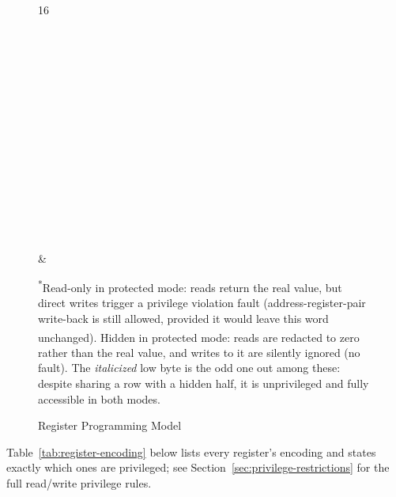 \begin{figure}[H]
	\centering
	\begin{bytefield}[bitwidth=1.1em]{16}
		 \\
		 \\
		 \\
		 \\
		 \\
		 \\
		 \\
		 \\
		 \\
		 \\
		 \\
		 \\
		 \\
		 \\
		 \\
		 \\
		 & 
	\end{bytefield}
	\caption{Register Programming Model}
	\label{fig:register-programming-model}

	\vspace{0.2cm}
	\footnotesize
	\textsuperscript{*}Read-only in protected mode: reads return the real value, but direct writes trigger a
	privilege violation fault (address-register-pair write-back is still allowed, provided it would leave this word
	unchanged). \quad \textsuperscript{\dag}Hidden in protected mode: reads are redacted to zero rather than the real
	value, and writes to it are silently ignored (no fault). The \textit{italicized}  low byte is the odd one out
	among these: despite sharing a row with a hidden half, it is unprivileged and fully accessible in both modes.
\end{figure}

Table~\ref{tab:register-encoding} below lists every register's encoding and states exactly which ones are privileged;
see Section~\ref{sec:privilege-restrictions} for the full read/write privilege rules.

